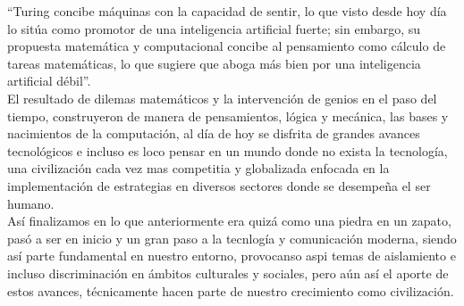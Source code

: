 “Turing concibe máquinas con la capacidad de sentir, lo que visto desde hoy día lo sitúa como promotor de una inteligencia artificial fuerte; sin embargo, su propuesta matemática y computacional concibe al pensamiento como cálculo de tareas matemáticas, lo que sugiere que aboga más bien por una inteligencia artificial débil”.\cite{Aliseda}\\[0.2cm]

El resultado de dilemas matemáticos y la intervención de genios en el paso del tiempo, construyeron de manera de pensamientos, lógica y mecánica, las bases y nacimientos de la computación, al día de hoy se disfrita de grandes avances tecnológicos e incluso es loco pensar en un mundo donde no exista la tecnología, una civilización cada vez mas competitia y globalizada enfocada en la implementación de estrategias en diversos sectores donde se desempeña el ser humano.\\[0.2cm]

Así finalizamos en lo que anteriormente era quizá como una piedra en un zapato, pasó a ser en inicio y un gran paso a la tecnlogía y comunicación moderna, siendo así parte fundamental en nuestro entorno, provocanso aspi temas de aislamiento e incluso discriminación en ámbitos culturales y sociales, pero aún así el aporte de estos avances, técnicamente hacen parte de nuestro crecimiento como civilización.\\[0.2cm]
